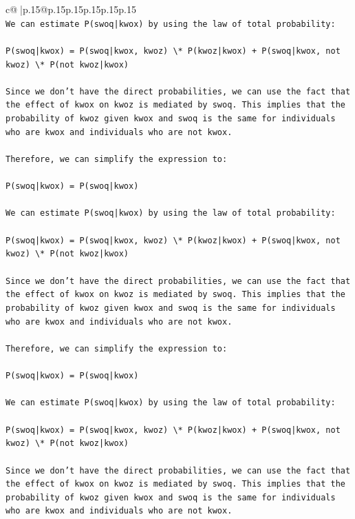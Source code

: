 \documentclass{article}
\begin{document}
{\begin{supertabular}{c@{$\;$}|p{.15\linewidth}@{}p{.15\linewidth}p{.15\linewidth}p{.15\linewidth}p{.15\linewidth}p{.15\linewidth}}
{{{\\ 
\texttt{We can estimate P(swoq|kwox) by using the law of total probability:} \\
\\ 
\texttt{P(swoq|kwox) = P(swoq|kwox, kwoz) \textbackslash{}* P(kwoz|kwox) + P(swoq|kwox, not kwoz) \textbackslash{}* P(not kwoz|kwox)} \\
\\ 
\texttt{Since we don't have the direct probabilities, we can use the fact that the effect of kwox on kwoz is mediated by swoq. This implies that the probability of kwoz given kwox and swoq is the same for individuals who are kwox and individuals who are not kwox.} \\
\\ 
\texttt{Therefore, we can simplify the expression to:} \\
\\ 
\texttt{P(swoq|kwox) = P(swoq|kwox)} \\
\\ 
\texttt{We can estimate P(swoq|kwox) by using the law of total probability:} \\
\\ 
\texttt{P(swoq|kwox) = P(swoq|kwox, kwoz) \textbackslash{}* P(kwoz|kwox) + P(swoq|kwox, not kwoz) \textbackslash{}* P(not kwoz|kwox)} \\
\\ 
\texttt{Since we don't have the direct probabilities, we can use the fact that the effect of kwox on kwoz is mediated by swoq. This implies that the probability of kwoz given kwox and swoq is the same for individuals who are kwox and individuals who are not kwox.} \\
\\ 
\texttt{Therefore, we can simplify the expression to:} \\
\\ 
\texttt{P(swoq|kwox) = P(swoq|kwox)} \\
\\ 
\texttt{We can estimate P(swoq|kwox) by using the law of total probability:} \\
\\ 
\texttt{P(swoq|kwox) = P(swoq|kwox, kwoz) \textbackslash{}* P(kwoz|kwox) + P(swoq|kwox, not kwoz) \textbackslash{}* P(not kwoz|kwox)} \\
\\ 
\texttt{Since we don't have the direct probabilities, we can use the fact that the effect of kwox on kwoz is mediated by swoq. This implies that the probability of kwoz given kwox and swoq is the same for individuals who are kwox and individuals who are not kwox.} \\
}}}
\end{supertabular}}
\end{document}
